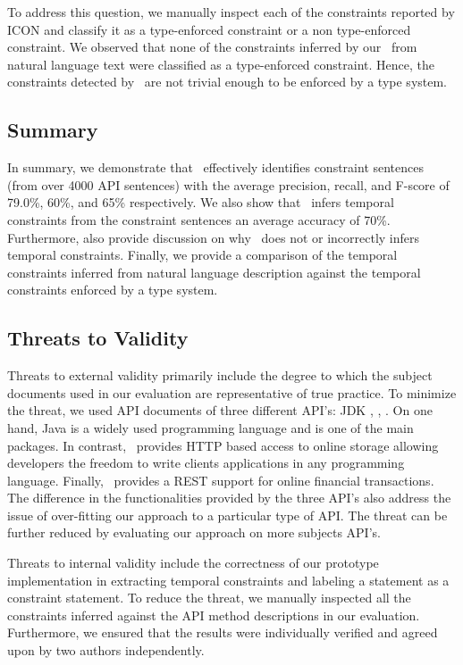 To address this question, we manually inspect each of the constraints reported by ICON and classify it as a type-enforced constraint or a non type-enforced constraint. 
We observed that none of the constraints inferred by our \tool\ from natural language text were classified as a type-enforced constraint.
Hence, the constraints detected by \tool\ are not trivial enough to be enforced by a type system.




\subsection{Summary}
\label{sub:summary}

In summary, we demonstrate that \tool\ effectively identifies constraint sentences (from over 4000 API sentences) with the average precision, recall, and F-score of 79.0\%, 60\%, and 65\% respectively. We also show that \tool\ infers temporal constraints from the constraint sentences an average accuracy of 70\%. Furthermore, also provide discussion on why \tool\ does not or incorrectly infers temporal constraints. Finally, we provide a comparison of the temporal constraints inferred from natural language description against the temporal constraints enforced by a type system. 


\subsection{Threats to Validity}
\label{sub:threats_to_validity}
Threats to external validity primarily include the degree to which the subject documents used in our evaluation are representative of true practice. To minimize the threat, we used API documents of three different API's: JDK , \amazonAPI, \paypalAPI. On one hand, Java is a widely used programming language and  is one of the main packages. In contrast, \amazonAPI\ provides HTTP based access to online storage allowing developers the freedom to write clients applications in any programming language. Finally, \paypalAPI\ provides a REST support for online financial transactions. The difference in the functionalities provided by the three API's also address the issue of over-fitting our approach to a particular type of API. The threat can be further reduced by evaluating our approach on more subjects API's. 

Threats to internal validity include the correctness of our prototype implementation in extracting temporal constraints and labeling a statement as a constraint statement. To reduce the threat, we manually inspected all the constraints inferred against the API method descriptions in our evaluation. Furthermore, we ensured that the results were individually verified and agreed upon by two authors independently.




